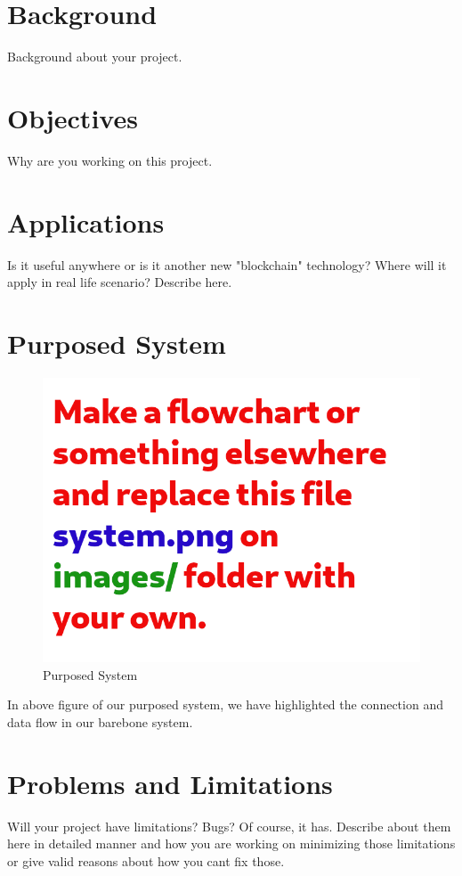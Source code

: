 \section{Background}

Background about your project.


\section{Objectives}

Why are you working on this project.

\section{Applications}

Is it useful anywhere or is it another new "blockchain" technology? Where will it apply in real life scenario? Describe here.


\section{Purposed System}

\begin{figure}[ht!]
    \centering
    \includegraphics[width=\textwidth]{images/system}
    \caption{Purposed System \label{overflow}}
\end{figure}

\noindent
In above figure of our purposed system, we have highlighted the connection and data flow in our barebone system.


\section{Problems and Limitations}

Will your project have limitations? Bugs? Of course, it has. Describe about them here in detailed manner and how you are working on minimizing those limitations or give valid reasons about how you cant fix those.


